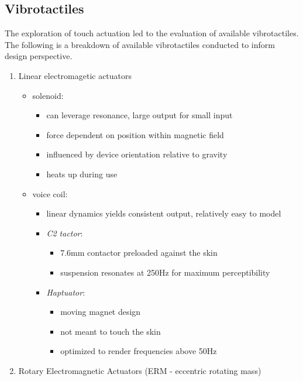 \subsection{Vibrotactiles}
The exploration of touch actuation led to the evaluation of available vibrotactiles. The following is a breakdown of available vibrotactiles conducted to inform design perspective.
\begin{enumerate}
    \item Linear electromagetic actuators
    \begin{itemize}
        \item solenoid:
        \begin{itemize}
            \item can leverage resonance, large output for small input
            \item force dependent on position within magnetic field
            \item influenced by device orientation relative to gravity
            \item heats up during use
        \end{itemize}
        \item voice coil:
        \begin{itemize}
            \item linear dynamics yields consistent output, relatively easy to model
            \item \textit{C2 tactor}:
            \begin{itemize}
                \item 7.6mm contactor preloaded against the skin
                \item suspension resonates at 250Hz for maximum perceptibility
            \end{itemize}
            \item \textit{Haptuator}:
            \begin{itemize}
                \item moving magnet design
                \item not meant to touch the skin
                \item optimized to render frequencies above 50Hz
            \end{itemize}
        \end{itemize}
    \end{itemize}
    \item Rotary Electromagnetic Actuators (ERM - eccentric rotating mass)
    \begin{itemize}

\end{itemize}
\end{enumerate}
